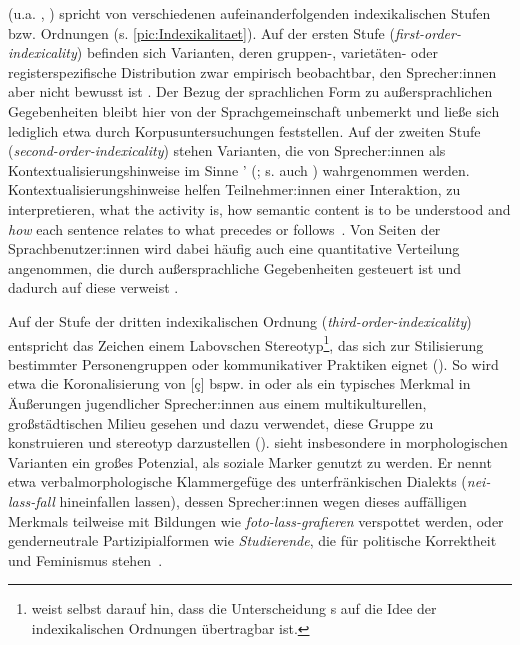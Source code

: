 \citeauthor{Silverstein1979} (u.a. \citeyear{Silverstein1979}, \citeyear{Silverstein2003}) spricht von verschiedenen aufeinanderfolgenden indexikalischen Stufen bzw. Ordnungen (s. \autoref{pic:Indexikalitaet}). 
Auf der ersten Stufe (\textit{first-order-indexicality}) befinden sich Varianten, deren gruppen-, varietäten- oder registerspezifische Distribution zwar empirisch beobachtbar, den Sprecher:innen aber nicht bewusst ist \citep[s.][265]{Spitzmuller2013}.
Der Bezug der sprachlichen Form zu außersprachlichen Gegebenheiten bleibt hier von der Sprachgemeinschaft unbemerkt und ließe sich lediglich etwa durch Korpusuntersuchungen feststellen.
Auf der zweiten Stufe (\textit{second-order-indexicality}) stehen Varianten, die von Sprecher:innen als Kontextualisierungshinweise im Sinne \citeauthor{Gumperz.1982}' (\citeyear{Gumperz.1982}; s. auch \citealp{Auer.1986}) wahrgenommen werden. 
Kontextualisierungshinweise helfen Teilnehmer:innen einer Interaktion, zu interpretieren, {\glqq}what the activity is, how semantic content is to be understood and \textit{how }each sentence relates to what precedes or follows{\grqq}~\citep[131, Hervorhebung im Original]{Gumperz.1982}. 
Von Seiten der Sprachbenutzer:innen wird dabei häufig auch eine quantitative Verteilung angenommen, die durch außersprachliche Gegebenheiten gesteuert ist und dadurch auf diese verweist \citep[s.][266]{Spitzmuller2013}. 

Auf der Stufe der dritten indexikalischen Ordnung (\textit{third-order-indexicality}) entspricht das Zeichen einem Labovschen Stereotyp\footnote{\citet[52]{Silverstein.2016} weist selbst darauf hin, dass die Unterscheidung \citeauthor{Labov1963}s auf die Idee der indexikalischen Ordnungen übertragbar ist.}, das sich zur Stilisierung bestimmter Personengruppen oder kommunikativer Praktiken eignet (\cites[s.][308--309]{Labov1978}[220]{Silverstein2003}[92]{Eckert2012}). 
So wird etwa die Koronalisierung von [ç] bspw. in  oder  als ein typisches Merkmal in Äußerungen jugendlicher Sprecher:innen aus einem multikulturellen, großstädtischen Milieu gesehen und dazu verwendet, diese Gruppe zu konstruieren und stereotyp darzustellen (\cites[s.][]{Androutsopoulos.2011}[11]{Auer2014}). 
\citet[523]{Harnisch.2005} sieht insbesondere in morphologischen Varianten ein großes Potenzial, als soziale Marker genutzt zu werden. 
Er nennt etwa verbalmorphologische Klammergef{\"u}ge des unterfr{\"a}nkischen Dialekts (\textit{nei-lass-fall} \glq hineinfallen lassen\grq), dessen Sprecher:innen wegen dieses auff{\"a}lligen Merkmals teilweise mit Bildungen wie \textit{foto-lass-grafieren }verspottet werden, oder genderneutrale Partizipialformen wie \textit{Studierende}, die f{\"u}r politische Korrektheit und Feminismus stehen~\citep[s.][524]{Harnisch.2005}.


